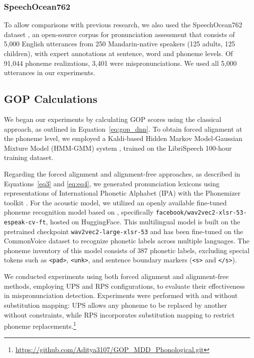 \documentclass{Interspeech}
\begin{document}
\subsubsection{SpeechOcean762} 

To allow comparisons with previous research, we also used the SpeechOcean762 dataset \cite{zhang2021speechocean762}, an open-source corpus for pronunciation assessment that consists of 5,000 English utterances from 250 Mandarin-native speakers (125 adults, 125 children), with expert annotations at sentence, word and phoneme levels. Of 91,044 phoneme realizations, 3,401 were mispronunciations. We used all 5,000 utterances in our experiments.


\subsection{GOP Calculations}
We began our experiments by calculating GOP scores using the classical approach, as outlined in Equation~\ref{eq:gop_dnn}. To obtain forced alignment at the phoneme level, we employed a Kaldi-based Hidden Markov Model-Gaussian Mixture Model (HMM-GMM) system \cite{povey2011kaldi}, trained on the LibriSpeech \cite{7178964} 100-hour training dataset.

Regarding the forced alignment and alignment-free approaches, as described in Equations~\ref{eq3} and \ref{eq:eq4}, we generated pronunciation lexicons using representations of International Phonetic Alphabet (IPA) with the Phonemizer toolkit \cite{Bernard2021}. For the acoustic model, we utilized an openly available fine-tuned phoneme recognition model based on \cite{xu2021simple}, specifically \texttt{facebook/wav2vec2-xlsr-53-espeak-cv-ft}, hosted on HuggingFace. This multilingual model is built on the pretrained checkpoint \texttt{wav2vec2-large-xlsr-53} and has been fine-tuned on the CommonVoice dataset \cite{ardila2019common} to recognize phonetic labels across multiple languages.
The phoneme inventory of this model consists of 387 phonetic labels, excluding special tokens such as \texttt{<pad>}, \texttt{<unk>}, and sentence boundary markers (\texttt{<s>} and \texttt{</s>}).

We conducted experiments using both forced alignment and alignment-free methods, employing UPS and RPS configurations, to evaluate their effectiveness in mispronunciation detection. Experiments were performed with and without substitution mapping: UPS allows any phoneme to be replaced by another without constraints, while RPS incorporates substitution mapping to restrict phoneme replacements.\footnote{\tiny{\url{https://github.com/Aditya3107/GOP_MDD_Phonological.git}}}
\end{document}
